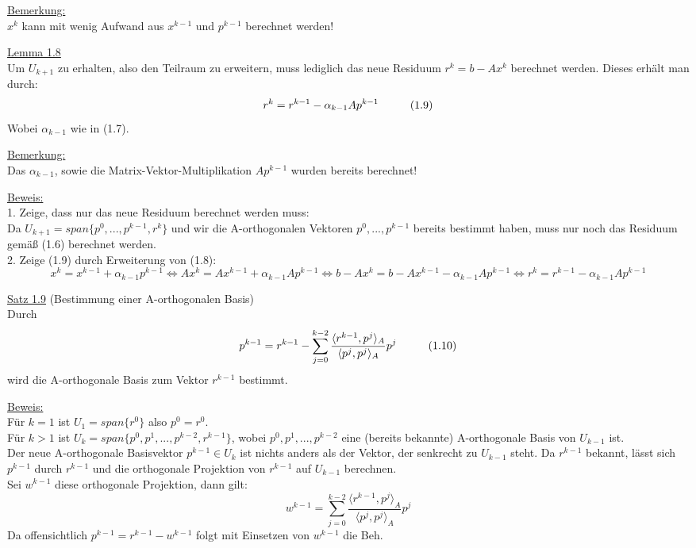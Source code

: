 \documentclass[a4paper]{letter}
\begin{document}
\underline{Bemerkung:}
\\$x^{k}$ kann mit wenig Aufwand aus $x^{k-1}$ und $p^{k-1}$ berechnet werden!

\underline{Lemma 1.8}
\\Um $U_{k+1}$ zu erhalten, also den Teilraum zu erweitern, muss lediglich das neue Residuum $r^{k} = b - Ax^{k}$ berechnet werden. Dieses erh\"alt man durch:
$$r^{k} = r^{k-1} - \alpha_{k-1}Ap^{k-1} \hspace{10mm} (1.9)$$
Wobei $\alpha_{k-1}$ wie in (1.7).

\underline{Bemerkung:}
\\Das $\alpha_{k-1}$, sowie die Matrix-Vektor-Multiplikation $Ap^{k-1}$ wurden bereits berechnet!

\underline{Beweis:}
\\1. Zeige, dass nur das neue Residuum berechnet werden muss:
\\Da $U_{k+1} = span\{p^{0},...,p^{k-1},r^{k}\}$ und wir die A-orthogonalen Vektoren $p^{0},...,p^{k-1}$ bereits bestimmt haben, muss nur noch das Residuum gem\"a{\ss} (1.6) berechnet werden.
\\2. Zeige (1.9) durch Erweiterung von (1.8):
$$x^{k} = x^{k-1} + \alpha_{k-1}p^{k-1}
\Longleftrightarrow Ax^{k} = Ax^{k-1} + \alpha_{k-1}Ap^{k-1}
\Longleftrightarrow b - Ax^{k} = b - Ax^{k-1} - \alpha_{k-1}Ap^{k-1}
\Longleftrightarrow r^{k} = r^{k-1} - \alpha_{k-1}Ap^{k-1}$$

\underline{Satz 1.9} (Bestimmung einer A-orthogonalen Basis)
\\Durch
$$p^{k-1} = r^{k-1} - \sum_{j=0}^{k-2} \frac {\langle r^{k-1}, p^{j} \rangle _{A}} {\langle p^{j}, p^{j} \rangle _{A}} p^{j} \hspace{10mm} (1.10)$$
wird die A-orthogonale Basis zum Vektor $r^{k-1}$ bestimmt.

\underline{Beweis:}
\\F\"ur $k = 1$ ist $U_{1} = span\{r^{0}\}$ also $p^{0} = r^{0}$.
\\F\"ur $k > 1$ ist $U_{k} = span\{p^{0}, p^{1}, ...,p^{k-2}, r^{k-1}\}$, wobei $p^{0}, p^{1}, ..., p^{k-2}$ eine (bereits bekannte) A-orthogonale Basis von $U_{k-1}$ ist.
\\Der neue A-orthogonale Basisvektor $p^{k-1} \in U_{k}$ ist nichts anders als der Vektor, der senkrecht zu $U_{k-1}$ steht. Da $r^{k-1}$ bekannt, l\"asst sich $p^{k-1}$ durch $r^{k-1}$ und die orthogonale Projektion von $r^{k-1}$ auf $U_{k-1}$ berechnen.
\\Sei $w^{k-1}$ diese orthogonale Projektion, dann gilt:
$$w^{k-1} = \sum_{j=0}^{k-2} \frac {\langle r^{k-1}, p^{j} \rangle _{A}} {\langle p^{j}, p^{j} \rangle _{A}} p^{j}$$
Da offensichtlich $p^{k-1} = r^{k-1} - w^{k-1}$ folgt mit Einsetzen von $w^{k-1}$ die Beh.
\end{document}
